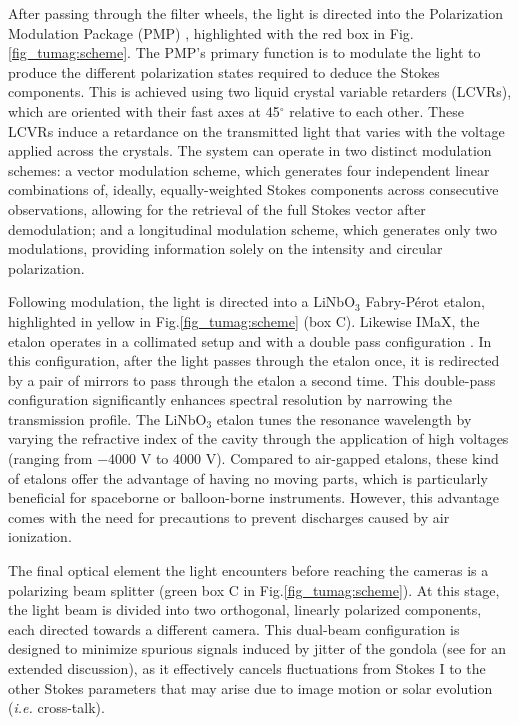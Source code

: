 After passing through the filter wheels, the light is directed into the Polarization Modulation Package (PMP) \citep{pmp1}, highlighted with the red box in Fig.\ref{fig_tumag:scheme}. The PMP's primary function is to modulate the light to produce the different polarization states required to deduce the Stokes components. This is achieved using two liquid crystal variable retarders (LCVRs), which are oriented with their fast axes at 45$^\circ$ relative to each other. These LCVRs induce a retardance on the transmitted light that varies with the voltage applied across the crystals. The system can operate in two distinct modulation schemes: a vector modulation scheme, which generates four independent linear combinations of, ideally, equally-weighted Stokes components across consecutive observations, allowing for the retrieval of the full Stokes vector after demodulation; and a longitudinal modulation scheme, which generates only two modulations, providing information solely on the intensity and circular polarization.

Following modulation, the light is directed into a LiNbO$_3$ Fabry-Pérot etalon, highlighted in yellow in Fig.\ref{fig_tumag:scheme} (box C). Likewise IMaX, the etalon operates in a collimated setup and with a double pass configuration \citep{etalon-doublepass}. In this configuration, after the light passes through the etalon once, it is redirected by a pair of mirrors to pass through the etalon a second time. This double-pass configuration significantly enhances spectral resolution by narrowing the transmission profile. The LiNbO$_3$ etalon tunes the resonance wavelength by varying the refractive index of the cavity through the application of high voltages (ranging from $-4000$ V to $4000$ V). Compared to air-gapped etalons, these kind of etalons offer the advantage of having no moving parts, which is particularly beneficial for spaceborne or balloon-borne instruments. However, this advantage comes with the need for precautions to prevent discharges caused by air ionization.

The final optical element the light encounters before reaching the cameras is a polarizing beam splitter (green box C in Fig.\ref{fig_tumag:scheme}). At this stage, the light beam is divided into two orthogonal, linearly polarized components, each directed towards a different camera. This dual-beam configuration \citep{lites-doublebeam} is designed to minimize spurious signals induced by jitter of the gondola (see \cite{libro_JoseCarlos} for an extended discussion), as it effectively cancels fluctuations from Stokes I to the other Stokes parameters that may arise due to image motion or solar evolution (\textit{i.e.} cross-talk).


